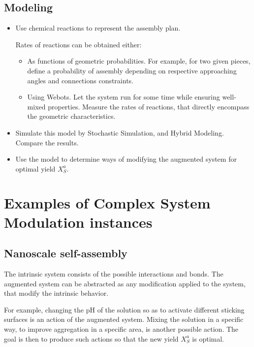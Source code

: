 \documentclass[letterpaper, oneside]{article}
\begin{document}
\subsection{Modeling} %
\label{sub:modeling}

\begin{itemize}
	\item Use chemical reactions to represent the assembly plan.

	Rates of reactions can be obtained either:
	\begin{itemize}
		\item As functions of geometric probabilities. For example, for two given pieces, define a probability of assembly depending on respective approaching angles and connections constraints.
		\item Using Webots. Let the system run for some time while ensuring well-mixed properties. Measure the rates of reactions, that directly encompass the geometric characteristics.
	\end{itemize}

	\item Simulate this model by Stochastic Simulation, and Hybrid Modeling. Compare the results.
	\item Use the model to determine ways of modifying the augmented system for optimal yield $X_S^a$.	
\end{itemize}


\section{Examples of Complex System Modulation instances} %
\label{sec:other_examples_of_the_complex_system_modulation_problem}

\subsection{Nanoscale self-assembly} %
\label{sub:nanoscale_self_assembly}
The intrinsic system consists of the possible interactions and bonds. The augmented system can be abstracted as any modification applied to the system, that modify the intrinsic behavior.

For example, changing the pH of the solution so as to activate different sticking surfaces is an action of the augmented system. Mixing the solution in a specific way, to improve aggregation in a specific area, is another possible action.
The goal is then to produce such actions so that the new yield $X_S^a$ is optimal.
\end{document}
